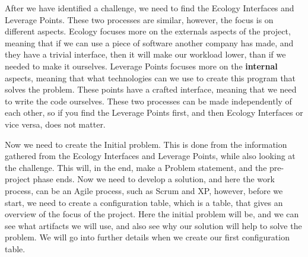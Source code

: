 After we have identified a challenge, we need to find the Ecology Interfaces and Leverage Points.
These two processes are similar, however, the focus is on different aspects.
Ecology focuses more on the externals aspects of the project, meaning that if we can use a piece of software another company has made, and they have a trivial interface, then it will make our workload lower, than if we needed to make it ourselves.
Leverage Points focuses more on the \textbf{internal} aspects, meaning that what technologies can we use to create this program that solves the problem.
These points have a crafted interface, meaning that we need to write the code ourselves.
These two processes can be made independently of each other, so if you find the Leverage Points first, and then Ecology Interfaces or vice versa, does not matter.

Now we need to create the Initial problem. 
This is done from the information gathered from the Ecology Interfaces and Leverage Points, while also looking at the challenge.
This will, in the end, make a Problem statement, and the pre-project phase ends.
Now we need to develop a solution, and here the work process, can be an Agile process, such as Scrum and XP, however, before we start, we need to create a configuration table, which is a table, that gives an overview of the focus of the project. Here the initial problem will be, and we can see what artifacts we will use, and also see why our solution will help to solve the problem.
We will go into further details when we create our first configuration table.

